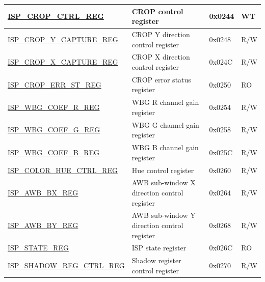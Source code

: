 \begin{longtable}{ | p{6cm} | p{7.2cm} | p{1.3cm} | p{1cm} | }
\hyperref[regdesc:ISPCROPCTRLREG]{ISP\_CROP\_CTRL\_REG} & CROP control register & 0x0244 & WT \\ \hline
\hyperref[regdesc:ISPCROPYCAPTUREREG]{ISP\_CROP\_Y\_CAPTURE\_REG} & CROP Y direction control register & 0x0248 & R/W \\ \hline
\hyperref[regdesc:ISPCROPXCAPTUREREG]{ISP\_CROP\_X\_CAPTURE\_REG} & CROP X direction control register & 0x024C & R/W \\ \hline
\hyperref[regdesc:ISPCROPERRSTREG]{ISP\_CROP\_ERR\_ST\_REG} & CROP error status register & 0x0250 & RO \\ \hline
\hyperref[regdesc:ISPWBGCOEFRREG]{ISP\_WBG\_COEF\_R\_REG} & WBG R channel gain register & 0x0254 & R/W \\ \hline
\hyperref[regdesc:ISPWBGCOEFGREG]{ISP\_WBG\_COEF\_G\_REG} & WBG G channel gain register & 0x0258 & R/W \\ \hline
\hyperref[regdesc:ISPWBGCOEFBREG]{ISP\_WBG\_COEF\_B\_REG} & WBG B channel gain register & 0x025C & R/W \\ \hline
\hyperref[regdesc:ISPCOLORHUECTRLREG]{ISP\_COLOR\_HUE\_CTRL\_REG} & Hue control register & 0x0260 & R/W \\ \hline
\hyperref[regdesc:ISPAWBBXREG]{ISP\_AWB\_BX\_REG} & AWB sub-window X direction control register & 0x0264 & R/W \\ \hline
\hyperref[regdesc:ISPAWBBYREG]{ISP\_AWB\_BY\_REG} & AWB sub-window Y direction control register & 0x0268 & R/W \\ \hline
\hyperref[regdesc:ISPSTATEREG]{ISP\_STATE\_REG} & ISP state register & 0x026C & RO \\ \hline
\hyperref[regdesc:ISPSHADOWREGCTRLREG]{ISP\_SHADOW\_REG\_CTRL\_REG} & Shadow register control register & 0x0270 & R/W \\ \hline


\end{longtable}

